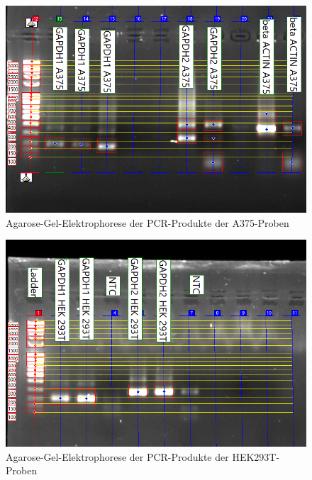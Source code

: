 \documentclass{article}
\begin{document}
\begin{figure}[H]
    \centering
    \includegraphics[width=\textwidth]{images/gel/a375bp.png}
    \caption{Agarose-Gel-Elektrophorese der PCR-Produkte der A375-Proben}
    \label{fig:gela375}
\end{figure}
\begin{figure}[H]
    \centering
    \includegraphics[width=\textwidth]{images/gel/hek293T.png}
    \caption{Agarose-Gel-Elektrophorese der PCR-Produkte der HEK293T-Proben}
    \label{fig:gela375}
\end{figure}
\end{document}
